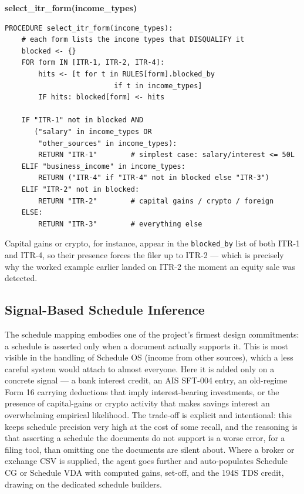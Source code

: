 \documentclass[12pt, a4paper, oneside]{report}
\newcommand{\algname}[1]{\par\vspace{0.6em}\noindent\textbf{\ttfamily #1}\nopagebreak}
\begin{document}
\algname{select\_itr\_form(income\_types)}
\begin{lstlisting}[style=pseudo]
PROCEDURE select_itr_form(income_types):
    # each form lists the income types that DISQUALIFY it
    blocked <- {}
    FOR form IN [ITR-1, ITR-2, ITR-4]:
        hits <- [t for t in RULES[form].blocked_by
                          if t in income_types]
        IF hits: blocked[form] <- hits

    IF "ITR-1" not in blocked AND
       ("salary" in income_types OR
        "other_sources" in income_types):
        RETURN "ITR-1"        # simplest case: salary/interest <= 50L
    ELIF "business_income" in income_types:
        RETURN ("ITR-4" if "ITR-4" not in blocked else "ITR-3")
    ELIF "ITR-2" not in blocked:
        RETURN "ITR-2"        # capital gains / crypto / foreign
    ELSE:
        RETURN "ITR-3"        # everything else
\end{lstlisting}

Capital gains or crypto, for instance, appear in the \texttt{blocked\_by} list
of both ITR-1 and ITR-4, so their presence forces the filer up to ITR-2 ---
which is precisely why the worked example earlier landed on ITR-2 the moment an
equity sale was detected.

\subsection{Signal-Based Schedule Inference}
The schedule mapping embodies one of the project's firmest design commitments:
a schedule is asserted only when a document actually supports it. This is most
visible in the handling of Schedule OS (income from other sources), which a less
careful system would attach to almost everyone. Here it is added only on a
concrete signal --- a bank interest credit, an AIS SFT-004 entry, an
old-regime Form 16 carrying deductions that imply interest-bearing investments,
or the presence of capital-gains or crypto activity that makes savings interest
an overwhelming empirical likelihood. The trade-off is explicit and intentional:
this keeps schedule precision very high at the cost of some recall, and the
reasoning is that asserting a schedule the documents do not support is a worse
error, for a filing tool, than omitting one the documents are silent about.
Where a broker or exchange CSV is supplied, the agent goes further and
auto-populates Schedule CG or Schedule VDA with computed gains, set-off, and the
194S TDS credit, drawing on the dedicated schedule builders.
\end{document}

